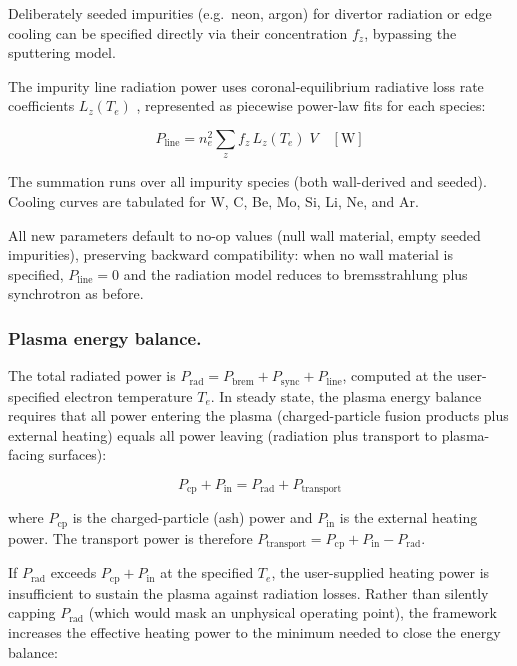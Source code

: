 \documentclass{article}
\begin{document}
Deliberately seeded impurities (e.g.\ neon, argon) for divertor
radiation or edge cooling can be specified directly via their
concentration $f_z$, bypassing the sputtering model.

The impurity line radiation power uses coronal-equilibrium radiative
loss rate coefficients $L_z(T_e)$
\citep{post1977, mavrin2018}, represented as piecewise
power-law fits for each species:

\begin{equation}
\label{eq:p-line}
P_{\text{line}} = n_e^2 \sum_z f_z \, L_z(T_e) \; V \quad [\text{W}]
\end{equation}

\noindent The summation runs over all impurity species (both
wall-derived and seeded). Cooling curves are tabulated for W, C, Be,
Mo, Si, Li, Ne, and Ar.

All new parameters default to no-op values (null wall material, empty
seeded impurities), preserving backward compatibility: when no wall
material is specified, $P_{\text{line}} = 0$ and the radiation model
reduces to bremsstrahlung plus synchrotron as before.

\subsubsection{Plasma energy balance.}

The total radiated power is
$P_{\text{rad}} = P_{\text{brem}} + P_{\text{sync}} + P_{\text{line}}$,
computed at the user-specified electron temperature $T_e$.
In steady state, the plasma energy balance requires that all power
entering the plasma (charged-particle fusion products plus external
heating) equals all power leaving (radiation plus transport to
plasma-facing surfaces):

\begin{equation}
\label{eq:plasma-balance}
P_{\text{cp}} + P_{\text{in}} = P_{\text{rad}} + P_{\text{transport}}
\end{equation}

\noindent where $P_{\text{cp}}$ is the charged-particle (ash) power and
$P_{\text{in}}$ is the external heating power. The transport power is
therefore $P_{\text{transport}} = P_{\text{cp}} + P_{\text{in}} - P_{\text{rad}}$.

If $P_{\text{rad}}$ exceeds $P_{\text{cp}} + P_{\text{in}}$ at the
specified $T_e$, the user-supplied heating power is insufficient to
sustain the plasma against radiation losses. Rather than silently
capping $P_{\text{rad}}$ (which would mask an unphysical operating
point), the framework increases the effective heating power to the
minimum needed to close the energy balance:
\end{document}
